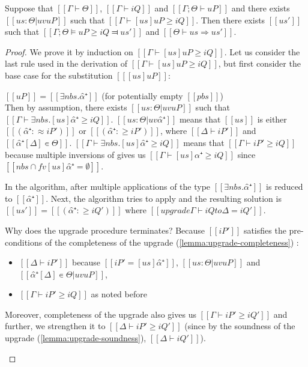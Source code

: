 \begin{lemma} \label{lemma:pos-subt-completeness}
    Suppose that $[[Γ ⊢ Θ]]$, $[[Γ ⊢ iQ]]$ and $[[Γ ; Θ ⊢ uP]]$ and
    there exists $[[us : Θ | uv uP]]$ such that $[[ Γ ⊢ [us]uP ≥ iQ ]]$.
    Then there exists $[[us']]$ such that $[[Γ ; Θ ⊨ uP ≥ iQ ⫤ us']]$
    and $[[Θ ⊢ us ⇒ us']]$.
\end{lemma}
\begin{proof}
    We prove it by induction on $[[ Γ ⊢ [us]uP ≥ iQ ]]$.
    Let us consider the last rule used in the derivation of  $[[ Γ ⊢ [us]uP ≥ iQ ]]$,
    but first consider the base case for the substitution $[[ [us]uP ]]$:

    \begin{caseof}
        \item \label{case:pos-subt-complete-base} $[[uP]] = [[ ∃nbs.α̂⁺ ]]$ (for potentially empty $[[pbs]]$)\\
        Then by assumption, there exists $[[us : Θ | uv uP]]$ such that $[[ Γ ⊢ ∃nbs.[us]α̂⁺ ≥ iQ ]]$.
        $[[us : Θ | uv α̂⁺]]$ means that  $[[us]]$ is either $[[ (α̂⁺ :≈ iP') ]]$ or $[[ (α̂⁺ :≥ iP') ]]$,
        where $[[Δ ⊢ iP']]$ and $[[α̂⁺[Δ] ∊ Θ]]$.
        $[[ Γ ⊢ ∃nbs.[us]α̂⁺ ≥ iQ ]]$ means that $[[Γ ⊢ iP' ≥ iQ]]$
        because multiple inversions of  
        gives us $[[Γ ⊢ [us]α̂⁺ ≥ iQ]]$ since $[[ {nbs} ∩ fv [us]α̂⁺ = ∅]]$.


        In the algorithm, after multiple applications of 
        the type $[[∃nbs.α̂⁺]]$ is reduced to $[[α̂⁺]]$.
        Next, the algorithm tries to apply
        and the resulting solution is $[[us']] = [[(α̂⁺ :≥ iQ')]]$ where
        $[[upgrade Γ ⊢ iQ to Δ = iQ']]$.

        Why does the upgrade procedure terminates?
        Because $[[iP']]$ satisfies the pre-conditions of the completeness of the upgrade
        (\cref{lemma:upgrade-completeness})
        :
        \begin{itemize}
            \item $[[Δ ⊢ iP']]$ because $[[iP' = [us]α̂⁺]]$, $[[us : Θ | uv uP]]$ and 
            $[[α̂⁺[Δ] ∊ Θ | uv uP]]$,
            \item $[[Γ ⊢ iP' ≥ iQ]]$ as noted before
        \end{itemize}
        Moreover, completeness of the upgrade also gives us $[[Γ ⊢ iP' ≥ iQ']]$
        and further, we strengthen it to $[[Δ ⊢ iP' ≥ iQ']]$
        (since by the soundness of the upgrade (\cref{lemma:upgrade-soundness}),
        $[[Δ ⊢ iQ']]$).


\end{caseof}
\end{proof}
